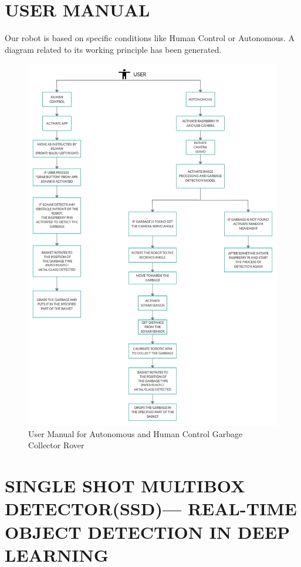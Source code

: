 \documentclass[conference]{IEEEtran}
\begin{document}
	\section{USER MANUAL}
	
	Our robot is based on specific conditions like Human Control or Autonomous. A diagram related to its working principle has been generated.
	\begin{figure}[htbp]
		\centerline{\includegraphics[scale=0.1]{cd.jpg}}
		\caption{User Manual for Autonomous and Human Control Garbage Collector Rover}
		\label{fig}
	\end{figure}
	
	
	\section{SINGLE SHOT MULTIBOX DETECTOR(SSD)— REAL-TIME OBJECT DETECTION IN DEEP LEARNING}
	
\end{document}
